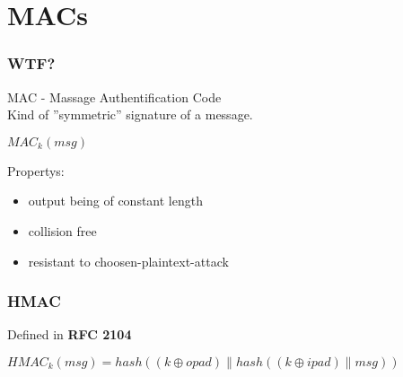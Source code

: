 \section{MACs}

\begin{frame}
	\frametitle{WTF?}
	MAC - Massage Authentification Code\\
	Kind of ''symmetric'' signature of a message.
	
	\begin{center}$MAC_k(msg)$\end{center}
	
	Propertys:
	\begin{itemize}
		\item output being of constant length
		\item collision free
		\item resistant to choosen-plaintext-attack
	\end{itemize}
\end{frame}

\begin{frame}
	\frametitle{HMAC}
	Defined in \textbf{RFC 2104}
	
	$HMAC_k(msg) = hash((k \oplus opad) \parallel hash((k \oplus ipad)\parallel msg) )$
\end{frame}